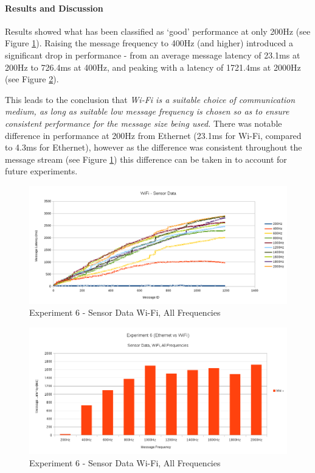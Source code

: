 \documentclass[../dissertation.tex]{subfiles}
\begin{document}
\paragraph{Results and Discussion} Results showed what has been classified as `good' performance at only 200Hz (see Figure \ref{exp6-sensor-wifi-all-freq-stream}). Raising the message frequency to 400Hz (and higher) introduced a significant drop in performance - from an average message latency of 23.1ms at 200Hz to 726.4ms at 400Hz, and peaking with a latency of 1721.4ms at 2000Hz (see Figure \ref{exp6-sensor-wifi-all-freq-mean}).

This leads to the conclusion that \textit{Wi-Fi is a suitable choice of communication medium, as long as suitable low message frequency is chosen so as to ensure consistent performance for the message size being used.} There was notable difference in performance at 200Hz from Ethernet (23.1ms for Wi-Fi, compared to 4.3ms for Ethernet), however as the difference was consistent throughout the message stream (see Figure \ref{exp6-sensor-wifi-all-freq-stream}) this difference can be taken in to account for future experiments.

\begin{figure}[H]
\centering
\includegraphics[width=\textwidth]{images/experiment6/sensor_data_wifi_all_freqs_stream.png}
\caption{Experiment 6 - Sensor Data Wi-Fi, All Frequencies}
\label{exp6-sensor-wifi-all-freq-stream}
\end{figure}

\begin{figure}[H]
\centering
\includegraphics[width=\textwidth]{images/experiment6/sensor_data_wifi_all_freqs_mean.png}
\caption{Experiment 6 - Sensor Data Wi-Fi, All Frequencies}
\label{exp6-sensor-wifi-all-freq-mean}
\end{figure}
\end{document}
